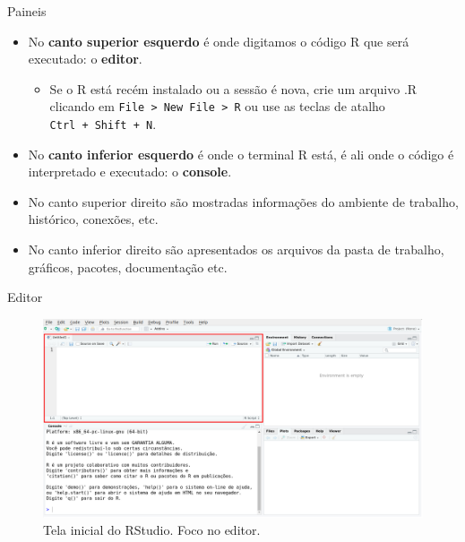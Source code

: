 \documentclass[
  ignorenonframetext,
  serif,
  professionalfont,
  usenames,
  dvipsnames,
  aspectratio = 169]{beamer}
\providecommand{\tightlist}{%
  \setlength{\itemsep}{0pt}\setlength{\parskip}{0pt}}
\renewcommand{\tightlist}{%
  \setlength{\itemsep}{0\baselineskip}
  \setlength{\parskip}{0.25\baselineskip}
}
\begin{document}
\begin{frame}[fragile]{Paineis}
\label{paineis}
\begin{itemize}
\item
  No \textbf{canto superior esquerdo} é onde digitamos o código R que
  será executado: o \textbf{editor}.

  \begin{itemize}
  \tightlist
  \item
    Se o R está recém instalado ou a sessão é nova, crie um arquivo .R
    clicando em
    \texttt{File\ \textgreater{}\ New\ File\ \textgreater{}\ R} ou use
    as teclas de atalho \texttt{Ctrl\ +\ Shift\ +\ N}.
  \end{itemize}
\item
  No \textbf{canto inferior esquerdo} é onde o terminal R está, é ali
  onde o código é interpretado e executado: o \textbf{console}.
\item
  No canto superior direito são mostradas informações do ambiente de
  trabalho, histórico, conexões, etc.
\item
  No canto inferior direito são apresentados os arquivos da pasta de
  trabalho, gráficos, pacotes, documentação etc.
\end{itemize}
\end{frame}

\begin{frame}{Editor}
\label{editor}
\begin{figure}

{\centering \includegraphics[width=0.85\linewidth]{./img/editor} 

}

\caption{Tela inicial do RStudio. Foco no editor.}\label{fig:unnamed-chunk-12}
\end{figure}
\end{frame}
\end{document}
